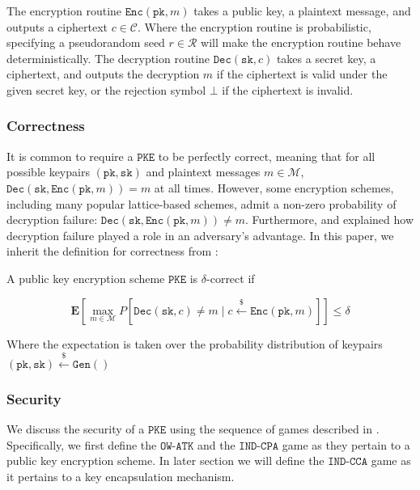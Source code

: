 \documentclass[floatrow,journal=tches,submission]{iacrtrans}
\newcommand{\monospace}{\texttt}
\newcommand{\pke}{\monospace{PKE}}
\newcommand{\keygen}{\monospace{Gen}}
\newcommand{\encrypt}{\monospace{Enc}}
\newcommand{\decrypt}{\monospace{Dec}}
\newcommand{\pk}{\monospace{pk}}
\newcommand{\sk}{\monospace{sk}}
\newcommand{\leftsample}{\stackrel{\$}{\leftarrow}}
\begin{document}
The encryption routine $\encrypt(\pk, m)$ takes a public key, a plaintext message, and outputs a ciphertext $c \in \mathcal{C}$. Where the encryption routine is probabilistic, specifying a pseudorandom seed $r \in \mathcal{R}$ will make the encryption routine behave deterministically. The decryption routine $\decrypt(\sk, c)$ takes a secret key, a ciphertext, and outputs the decryption $\hat{m}$ if the ciphertext is valid under the given secret key, or the rejection symbol $\bot$ if the ciphertext is invalid.

\subsubsection{Correctness}
It is common to require a $\pke$ to be perfectly correct, meaning that for all possible keypairs $(\pk, \sk)$ and plaintext messages $m \in \mathcal{M}$, $\decrypt(\sk, \encrypt(\pk, m)) = m$ at all times. However, some encryption schemes, including many popular lattice-based schemes, admit a non-zero probability of decryption failure: $\decrypt(\sk, \encrypt(\pk, m)) \neq m$. Furthermore, \cite{hofheinz2017modular} and \cite{avanzi2019crystals} explained how decryption failure played a role in an adversary's advantage. In this paper, we inherit the definition for correctness from \cite{hofheinz2017modular}:

\begin{definition}\label{def:delta-correctness}
    A public key encryption scheme $\pke$ is $\delta$-correct if

    \begin{equation*}
        \mathbf{E}[
            \max_{m \in \mathcal{M}} P[\decrypt(\sk, c) \neq m \mid c \leftsample \encrypt(\pk, m)]
        ] \leq \delta
    \end{equation*}

    Where the expectation is taken over the probability distribution of keypairs $(\pk, \sk) \leftsample \keygen()$
\end{definition}

\subsubsection{Security}
We discuss the security of a $\pke$ using the sequence of games described in \cite{shoup2004sequences}. Specifically, we first define the $\monospace{OW-ATK}$ and the $\monospace{IND-CPA}$ game as they pertain to a public key encryption scheme. In later section we will define the $\monospace{IND-CCA}$ game as it pertains to a key encapsulation mechanism.
\end{document}
